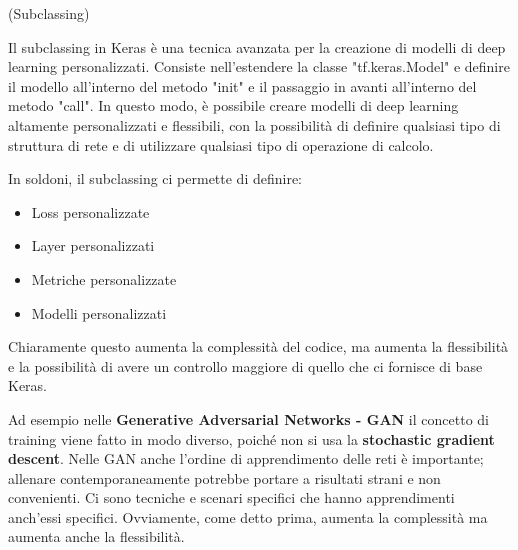 \begin{definition}(Subclassing)
\end{definition}

Il subclassing in Keras è una tecnica avanzata per la creazione di modelli di
deep learning personalizzati. Consiste nell'estendere la classe
"tf.keras.Model" e definire il modello all'interno del metodo "init" e il
passaggio in avanti all'interno del metodo "call". In questo modo, è possibile
creare modelli di deep learning altamente personalizzati e flessibili, con la
possibilità di definire qualsiasi tipo di struttura di rete e di utilizzare
qualsiasi tipo di operazione di calcolo.

In soldoni, il subclassing ci permette di definire:
\begin{itemize}
    \item Loss personalizzate
    \item Layer personalizzati
    \item Metriche personalizzate
    \item Modelli personalizzati
\end{itemize}

Chiaramente questo aumenta la complessità del codice, ma aumenta la
flessibilità e la possibilità di avere un controllo maggiore di quello che ci
fornisce di base Keras.

Ad esempio nelle \textbf{Generative Adversarial Networks - GAN} il concetto di
training viene fatto in modo diverso, poiché non si usa la \textbf{stochastic
    gradient descent}. Nelle GAN anche l'ordine di apprendimento delle reti è
importante; allenare contemporaneamente potrebbe portare a risultati strani e
non convenienti. Ci sono tecniche e scenari specifici che hanno apprendimenti
anch'essi specifici. Ovviamente, come detto prima, aumenta la complessità ma
aumenta anche la flessibilità.

\newpage

